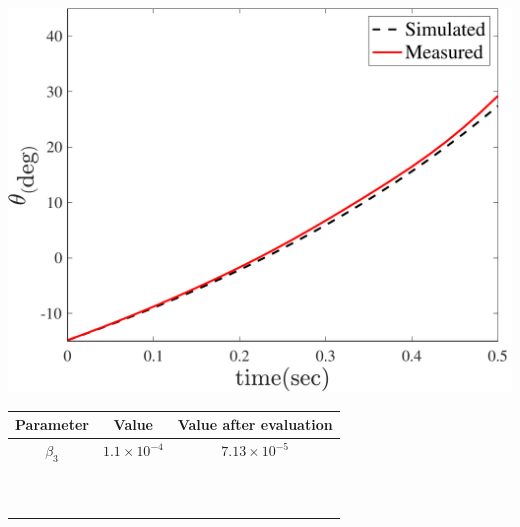 \documentclass[3p,times]{elsarticle}
\newcommand\Tstrut{\rule{0pt}{2.6ex}}         %
\begin{document}
\begin{minipage}[t]{0.95\linewidth}
	\hfill
    \begin{minipage}[b]{0.48\linewidth}
		\centering
		\includegraphics[width=1\linewidth]{../Figure/parameter_estimation/pitch/pitch}
		\captionsetup{justification=centering}
	\end{minipage}
	\begin{minipage}[b]{0.49\linewidth}
		\centering
		\begin{tabular}{ccc}\hline
			Parameter & Value & Value after evaluation
            \Tstrut\\ \hline
			$\beta_3$  & $1.1\times10^{-4}$ & $7.13\times10^{-5}$  \Tstrut\\ \hline
			\\
			\\\\\\\\\\\\\\\\\\
		\end{tabular}
	\captionsetup{justification=centering}
	\end{minipage}
\end{minipage}

\end{document}
